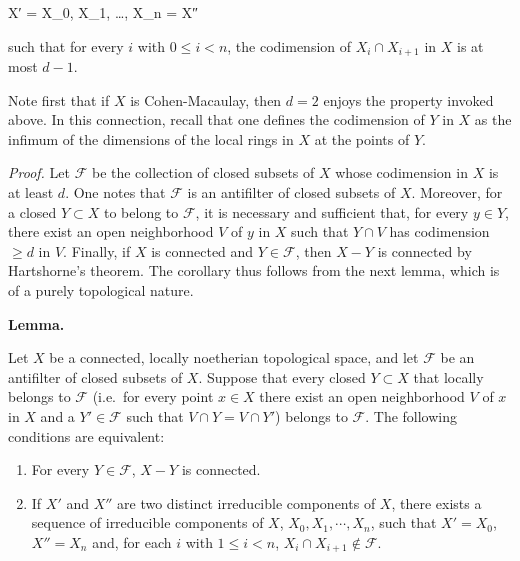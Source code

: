 \documentclass[
  11pt,
  a4paper,
]{book}
\newenvironment{Shaded}{}{}
\newcommand{\NormalTok}[1]{#1}
\providecommand{\tightlist}{%
  \setlength{\itemsep}{0pt}\setlength{\parskip}{0pt}}
\begin{document}
\begin{Shaded}
\begin{Highlighting}[]
\NormalTok{X′ = X\_0, X\_1, …, X\_n = X″}
\end{Highlighting}
\end{Shaded}

such that for every \(i\) with \(0 \leqslant i < n\), the codimension of
\(X_{i} \cap X_{i+1}\) in \(X\) is at most \(d - 1\).

Note first that if \(X\) is Cohen-Macaulay, then \(d = 2\) enjoys the
property invoked above. In this connection, recall that one defines the
codimension of \(Y\) in \(X\) as the infimum of the dimensions of the
local rings in \(X\) at the points of \(Y\).

\emph{Proof.} Let \(\mathcal{F}\) be the collection of closed subsets of
\(X\) whose codimension in \(X\) is at least \(d\). One notes that
\(\mathcal{F}\) is an antifilter of closed subsets of \(X\). Moreover,
for a closed \(Y \subset X\) to belong to \(\mathcal{F}\), it is
necessary and sufficient that, for every \(y \in Y\), there exist an
open neighborhood \(V\) of \(y\) in \(X\) such that \(Y \cap V\) has
codimension \(\geqslant d\) in \(V\). Finally, if \(X\) is connected and
\(Y \in \mathcal{F}\), then \(X - Y\) is connected by Hartshorne's
theorem. The corollary thus follows from the next lemma, which is of a
purely topological nature.

\textbf{Lemma.}

Let \(X\) be a connected, locally noetherian topological space, and let
\(\mathcal{F}\) be an antifilter of closed subsets of \(X\). Suppose
that every closed \(Y \subset X\) that locally belongs to
\(\mathcal{F}\) (i.e.~for every point \(x \in X\) there exist an open
neighborhood \(V\) of \(x\) in \(X\) and a \(Y' \in \mathcal{F}\) such
that \(V \cap Y = V \cap Y'\)) belongs to \(\mathcal{F}\). The following
conditions are equivalent:

\begin{enumerate}
\def\labelenumi{\arabic{enumi}.}
\tightlist
\item
  For every \(Y \in \mathcal{F}\), \(X - Y\) is connected.
\item
  If \(X'\) and \(X''\) are two distinct irreducible components of
  \(X\), there exists a sequence of irreducible components of \(X\),
  \(X_{0}, X_{1}, \cdots, X_{n}\), such that \(X' = X_{0}\),
  \(X'' = X_{n}\) and, for each \(i\) with \(1 \leqslant i <
  n\), \(X_{i} \cap X_{i+1} \notin \mathcal{F}\).
\end{enumerate}
\end{document}
